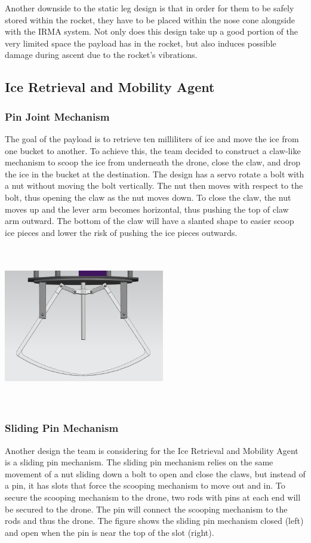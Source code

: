             Another downside to the static leg design is that in order for them to be safely stored within the rocket, they have to be placed within the nose cone alongside with the IRMA system. Not only does this design take up a good portion of the very limited space the payload has in the rocket, but also induces possible damage during ascent due to the rocket’s vibrations.  
              

	\subsection{Ice Retrieval and Mobility Agent}
		\subsubsection{Pin Joint Mechanism}
			The goal of the payload is to retrieve ten milliliters of ice and move the ice from one bucket to another. To achieve this, the team decided to construct a claw-like mechanism to scoop the ice from underneath the drone, close the claw, and drop the ice in the bucket at the destination. The design has a servo rotate a bolt with a nut without moving the bolt vertically. The nut then moves with respect to the bolt, thus opening the claw as the nut moves down. To close the claw, the nut moves up and the lever arm becomes horizontal, thus pushing the top of claw arm outward. The bottom of the claw will have a slanted shape to easier scoop ice pieces and lower the risk of pushing the ice pieces outwards. 

			\includegraphics[width = 7cm, height = 7cm]{img/PL/pin1.PNG}

		\subsubsection{Sliding Pin Mechanism}
			Another design the team is considering for the Ice Retrieval and Mobility Agent is a sliding pin mechanism. The sliding pin mechanism relies on the same movement of a nut sliding down a bolt to open and close the claws, but instead of a pin, it has slots that force the scooping mechanism to move out and in. To secure the scooping mechanism to the drone, two rods with pins at each end will be secured to the drone. The pin will connect the scooping mechanism to the rods and thus the drone. The figure shows the sliding pin mechanism closed (left) and open when the pin is near the top of the slot (right). 

